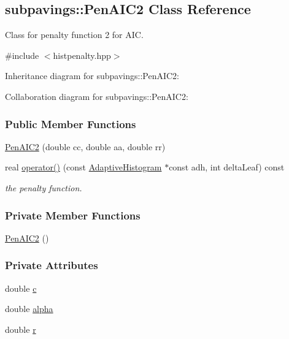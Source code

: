 \hypertarget{classsubpavings_1_1PenAIC2}{\subsection{subpavings\-:\-:\-Pen\-A\-I\-C2 \-Class \-Reference}
\label{classsubpavings_1_1PenAIC2}
}


\-Class for penalty function 2 for \-A\-I\-C.  




{\ttfamily \#include $<$histpenalty.\-hpp$>$}



\-Inheritance diagram for subpavings\-:\-:\-Pen\-A\-I\-C2\-:


\-Collaboration diagram for subpavings\-:\-:\-Pen\-A\-I\-C2\-:
\subsubsection*{\-Public \-Member \-Functions}
\begin{DoxyCompactItemize}
\item 
\hyperlink{classsubpavings_1_1PenAIC2_a581cc3e9120ac50e1ef0bf4b8e1d6de4}{\-Pen\-A\-I\-C2} (double cc, double aa, double rr)
\item 
real \hyperlink{classsubpavings_1_1PenAIC2_afe8b5949a89a7bf9f4e3e5cd6134ffb0}{operator()} (const \hyperlink{classsubpavings_1_1AdaptiveHistogram}{\-Adaptive\-Histogram} $\ast$const adh, int delta\-Leaf) const 
\begin{DoxyCompactList}\small\item\em the penalty function. \end{DoxyCompactList}\end{DoxyCompactItemize}
\subsubsection*{\-Private \-Member \-Functions}
\begin{DoxyCompactItemize}
\item 
\hyperlink{classsubpavings_1_1PenAIC2_aa3ee29ee43affa38807733d79b4d6555}{\-Pen\-A\-I\-C2} ()
\end{DoxyCompactItemize}
\subsubsection*{\-Private \-Attributes}
\begin{DoxyCompactItemize}
\item 
double \hyperlink{classsubpavings_1_1PenAIC2_ae8ecf3533342ef935f948f0c0ad0d0e3}{c}
\item 
double \hyperlink{classsubpavings_1_1PenAIC2_af9f26869dfdd1bd60470da30fe3d3bf9}{alpha}
\item 
double \hyperlink{classsubpavings_1_1PenAIC2_a1be98678a0fc1e824698714fbdc4b679}{r}
\end{DoxyCompactItemize}


